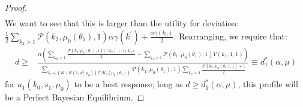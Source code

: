 \documentclass[11pt,]{article}
\begin{document}
\begin{proof}
\begin{align*}
\end{align*}
We want to see that this is larger than the utility for deviation: $\frac{1}{2}\sum_{k_2>1}\mathcal{P}(k_2,\mu_0(\theta_1),1)\alpha\gamma(k^{\prime})+\frac{\alpha\gamma(k_0)}{2}$.  Rearranging, we require that:
\begin{align*}
d\geq&\frac{\alpha\left(\sum_{k_2>1}\frac{\mathcal{P}(k_2,\mu_0(\theta_1),1)\gamma(k_2)+\gamma(k_0)}{2}-\sum_{k_1>1}\mathcal{P}(k_1,\mu_0(\theta_1),1)V(k_1,1,1)\right)}{\sum_{k_1\in(K\backslash K(1,\mu_1^2,\mu_0))\bigcap K_2(\mu_0(\theta_2))}\mathcal{P}(k_1,\mu_0(\theta_1),1)\sum_{k_2>1}\frac{\mathcal{P}(k_2,\mu_0(\theta_2),1)+1}{2}}\equiv d_1^*(\alpha,\mu)
\end{align*}for $a_1(k_0,s_1,\mu_0)$ to be a best response; long as $d\geq d_1^*(\alpha,\mu)$, this profile will be a Perfect Bayesian Equilibrium.




\end{proof}
\end{document}
